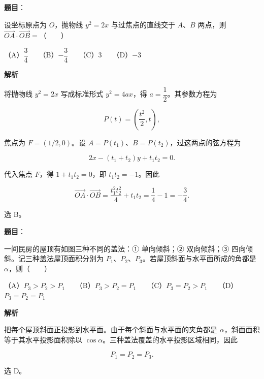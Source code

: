 \begin{answer}

\textbf{题目}：

设坐标原点为 $O$，抛物线 $y^2=2x$ 与过焦点的直线交于 $A$、$B$ 两点，则 $\overrightarrow{OA}\cdot\overrightarrow{OB}=$\mbox{（　　）}

（A）$\dfrac34$　　（B）$-\dfrac34$　　（C）$3$　　（D）$-3$

\textbf{解析}

将抛物线 $y^2=2x$ 写成标准形式 $y^2=4ax$，得 $a=\dfrac12$。其参数方程为

\nopagebreak[4]
\[
P(t)=\left(\frac{t^2}{2},t\right),
\]

焦点为 $F=(1/2,0)$。设 $A=P(t_1)$、$B=P(t_2)$，过这两点的弦方程为

\nopagebreak[4]
\[
2x-(t_1+t_2)y+t_1t_2=0.
\]

代入焦点 $F$，得 $1+t_1t_2=0$，即 $t_1t_2=-1$。因此

\nopagebreak[4]
\[
\overrightarrow{OA}\cdot\overrightarrow{OB}
=\frac{t_1^2t_2^2}{4}+t_1t_2
=\frac14-1=-\frac34.
\]

选 B。


\end{answer}
\begin{answer}

\textbf{题目}：

一间民房的屋顶有如图三种不同的盖法：① 单向倾斜；② 双向倾斜；③ 四向倾斜。记三种盖法屋顶面积分别为 $P_1$、$P_2$、$P_3$。若屋顶斜面与水平面所成的角都是 $\alpha$，则\mbox{（　　）}
\nopagebreak[4]
\begin{center}\end{center}
\nopagebreak[4]
（A）$P_3>P_2>P_1$　　（B）$P_3>P_2=P_1$　　（C）$P_3=P_2>P_1$　　（D）$P_3=P_2=P_1$

\textbf{解析}

把每个屋顶斜面正投影到水平面。由于每个斜面与水平面的夹角都是 $\alpha$，斜面面积等于其水平投影面积除以 $\cos\alpha$。三种盖法覆盖的水平投影区域相同，因此

\nopagebreak[4]
\[
P_1=P_2=P_3.
\]

选 D。


\end{answer}
